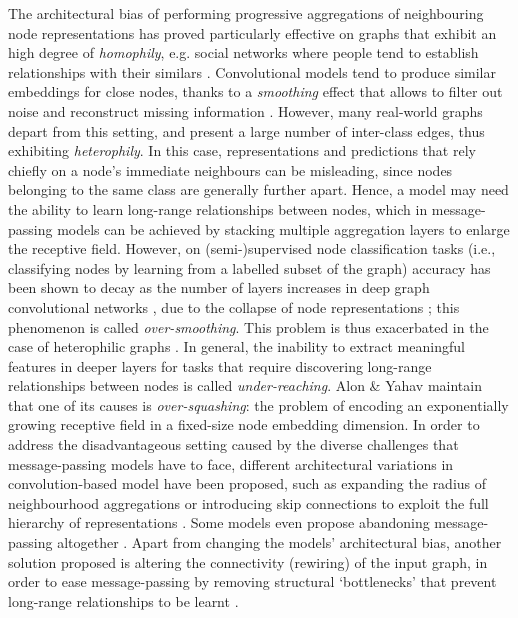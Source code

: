 \documentclass[final,5p,times,twocolumn]{elsarticle}
\begin{document}
The architectural bias of performing progressive aggregations of neighbouring node representations has proved particularly effective on graphs that exhibit an high degree of \emph{homophily}, e.g. social networks where people tend to establish relationships with their similars \cite{McPherson2001}.
Convolutional models tend to produce similar embeddings for close nodes, thanks to a \emph{smoothing} effect that allows to filter out noise and reconstruct missing information \cite{Keriven2022}.
However, many real-world graphs depart from this setting, and present a large number of inter-class edges, thus exhibiting \emph{heterophily}.
In this case, representations and predictions that rely chiefly on a node's immediate neighbours can be misleading, since nodes belonging to the same class are generally further apart.
Hence, a model may need the ability to learn long-range relationships between nodes, which in message-passing models can be achieved by stacking multiple aggregation layers to enlarge the receptive field.
However, on (semi-)supervised node classification tasks (i.e., classifying nodes by learning from a labelled subset of the graph) accuracy has been shown to decay as the number of layers increases in deep graph convolutional networks \cite{Li2018}, due to the collapse of node representations \cite{Oono2020}; this phenomenon is called \emph{over-smoothing}.
This problem is thus exacerbated in the case of heterophilic graphs \cite{Yan2022}.
In general, the inability to extract meaningful features in deeper layers for tasks that require discovering long-range relationships between nodes is called \emph{under-reaching}.
Alon \& Yahav \cite{Alon2021} maintain that one of its causes is \emph{over-squashing}: the problem of encoding an exponentially growing receptive field \cite{Micheli2009} in a fixed-size node embedding dimension.
In order to address the disadvantageous setting caused by the diverse challenges that message-passing models have to face, different architectural variations in convolution-based model have been proposed, such as expanding the radius of neighbourhood aggregations or introducing skip connections to exploit the full hierarchy of representations \cite{Zhu2020}.
Some models even propose abandoning message-passing altogether \cite{Lim2021}.
Apart from changing the models' architectural bias, another solution proposed is altering the connectivity (rewiring) of the input graph, in order to ease message-passing by removing structural `bottlenecks' that prevent long-range relationships to be learnt \cite{Topping2022}.
\end{document}
